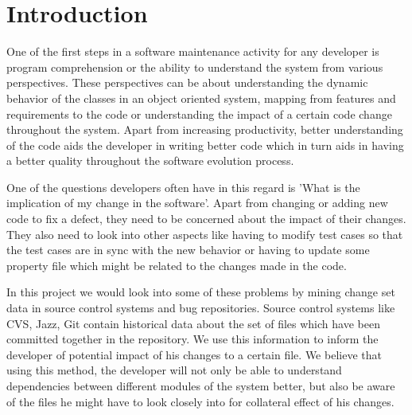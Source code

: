 
\section{Introduction}
\label{sec:intro}

One of the first steps in a software maintenance activity for any developer is program comprehension or the ability to understand the system from various perspectives. These perspectives can be about understanding the dynamic behavior of the classes in an object oriented system, mapping from features and requirements to the code or understanding the impact of a certain code change throughout the system. Apart from increasing productivity, better understanding of the code aids the developer in writing better code which in turn aids in having a better quality throughout the software evolution process.

One of the questions developers often have in this regard is 'What is the implication of my change in the software'. Apart from changing or adding new code to fix a defect, they need to be concerned about the impact of their changes. They also need to look into other aspects like having to modify test cases so that the test cases are in sync with the new behavior or having to update some property file which might be related to the changes made in the code.

In this project we would look into some of these problems by mining change set data in source control systems and bug repositories. Source control systems like CVS, Jazz, Git contain historical data about the set of files which have been committed together in the repository. We use this information to inform the developer of potential impact of his changes to a certain file. We believe that using this method, the developer will not only be able to understand dependencies between different modules of the system better, but also be aware of the files he might have to look closely into for
collateral effect of his changes.